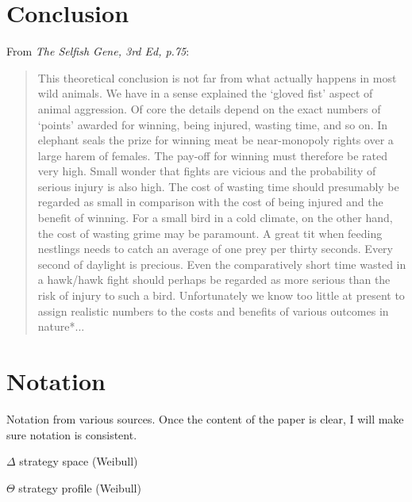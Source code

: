 \section{Conclusion}
From \emph{The Selfish Gene, 3rd Ed, p.75}:
\begin{quote}
This theoretical conclusion is not far from what actually happens in most wild animals. We have in a sense explained the `gloved fist' aspect of animal aggression. Of core the details depend on the exact numbers of `points' awarded for winning, being injured, wasting time, and so on. In elephant seals the prize for winning meat be near-monopoly rights over a large harem of females. The pay-off for winning must therefore be rated very high. Small wonder that fights are vicious and the probability of serious injury is also high. The cost of wasting time should presumably be regarded as small in comparison with the cost of being injured and the benefit of winning. For a small bird in a cold climate, on the other hand, the cost of wasting grime may be paramount. A great tit when feeding nestlings needs to catch an average of one prey per thirty seconds. Every second of daylight is precious. Even the comparatively short time wasted in a hawk/hawk fight should perhaps be regarded as more serious than the risk of injury to such a bird. Unfortunately we know too little at present to assign realistic numbers to the costs and benefits of various outcomes in nature*...
\end{quote}



\section{Notation}
Notation from various sources. Once the content of the paper is clear, I will make sure notation is consistent. 

$\Delta$ strategy space (Weibull)

$\Theta$ strategy profile (Weibull)









